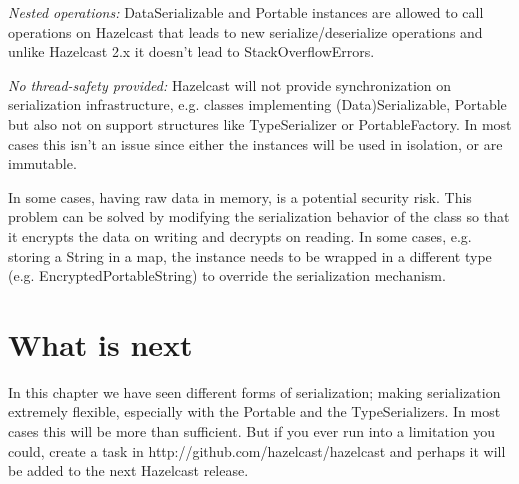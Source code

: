 \emph{Nested operations:} DataSerializable and Portable instances are allowed to call operations on Hazelcast that leads to new serialize/deserialize operations and unlike Hazelcast 2.x it doesn't lead to StackOverflowErrors.

\emph{No thread-safety provided:} Hazelcast will not provide synchronization on serialization infrastructure, e.g. classes implementing (Data)Serializable, Portable but also not on support structures like TypeSerializer or PortableFactory. In most cases this isn't an issue since either the instances will be used in isolation, or are immutable.

 In some cases, having raw data in memory, is a potential security risk. This problem can be solved by modifying the serialization behavior of the class so that it encrypts the data on writing and decrypts on reading. In some cases, e.g. storing a String in a map, the instance needs to be wrapped in a different type (e.g. EncryptedPortableString) to override the serialization mechanism.

\section{What is next}
In this chapter we have seen different forms of serialization; making serialization extremely flexible, especially with the Portable and the TypeSerializers. In most cases this will be more than sufficient. But if you ever run into a limitation you could, create a task in http://github.com/hazelcast/hazelcast and perhaps it will be added to the next Hazelcast release.